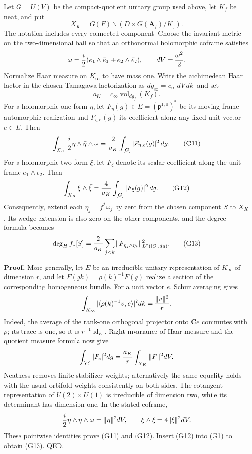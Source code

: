 \documentclass[11pt,a4paper]{article}
\theoremstyle{definition}
\begin{document}
Let \(G=U(V)\) be the compact-quotient unitary group used above, let \(K_f\) be neat, and put \[
X_K=G(F)\backslash(D\times G(\mathbf A_f)/K_f).
\] The notation includes every connected component. Choose the invariant metric on the two-dimensional ball so that an orthonormal holomorphic coframe satisfies \[
\omega={i\over2}(e_1\wedge\bar e_1+e_2\wedge\bar e_2),\qquad dV={\omega^2\over2}.
\] Normalize Haar measure on \(K_\infty\) to have mass one. Write the archimedean Haar factor in the chosen Tamagawa factorization as \(dg_\infty=c_\infty\,dV\,dk\), and set \[
a_K=c_\infty\operatorname{vol}_{dg_f}(K_f).
\] For a holomorphic one-form \(\eta\), let \(F_\eta(g)\in E=(\mathfrak p^{1,0})^*\) be its moving-frame automorphic realization and \(F_{\eta,e}(g)\) its coefficient along any fixed unit vector \(e\in E\). Then \[
\int_{X_K}{i\over2}\eta\wedge\bar\eta\wedge\omega
={2\over a_K}\int_{[G]}|F_{\eta,e}(g)|^2\,dg.
\tag{G11}
\] For a holomorphic two-form \(\xi\), let \(F_\xi\) denote its scalar coefficient along the unit frame \(e_1\wedge e_2\). Then \[
\int_{X_K}\xi\wedge\bar\xi
={4\over a_K}\int_{[G]}|F_\xi(g)|^2\,dg.
\tag{G12}
\] Consequently, extend each \(\eta_j=f^*\omega_j\) by zero from the chosen component \(S\) to \(X_K\). Its wedge extension is also zero on the other components, and the degree formula becomes \[
\deg_H f_*[S]={2\over a_K}\sum_{j<k}\|F_{\eta_j\wedge\eta_k}\|_{L^2([G],dg)}^2.
\tag{G13}
\]

\textbf{Proof.} More generally, let \(E\) be an irreducible unitary representation of \(K_\infty\) of dimension \(r\), and let \(F(gk)=\rho(k)^{-1}F(g)\) realize a section of the corresponding homogeneous bundle. For a unit vector \(e\), Schur averaging gives \[
\int_{K_\infty}|\langle\rho(k)^{-1}v,e\rangle|^2dk={\|v\|^2\over r}.
\] Indeed, the average of the rank-one orthogonal projector onto \(\mathbf Ce\) commutes with \(\rho\); its trace is one, so it is \(r^{-1}\operatorname{id}_E\). Right invariance of Haar measure and the quotient measure formula now give \[
\int_{[G]}|F_e|^2dg={a_K\over r}\int_{X_K}\|F\|^2dV.
\] Neatness removes finite stabilizer weights; alternatively the same equality holds with the usual orbifold weights consistently on both sides. The cotangent representation of \(U(2)\times U(1)\) is irreducible of dimension two, while its determinant has dimension one. In the stated coframe, \[
{i\over2}\eta\wedge\bar\eta\wedge\omega=\|\eta\|^2dV,
\qquad
\xi\wedge\bar\xi=4\|\xi\|^2dV.
\] These pointwise identities prove (G11) and (G12). Insert (G12) into (G1) to obtain (G13). QED.
\end{document}
